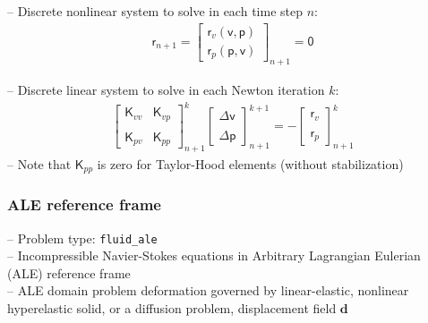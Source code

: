 \documentclass[a4paper,12pt]{report}
\newcommand{\bs}[1]{\boldsymbol{#1}}
\newcommand{\ROP}{\bs{\mathsf{r}}}
\begin{document}
-- Discrete nonlinear system to solve in each time step $n$:
\begin{equation}
\label{equation-nonlin-sys-fluid}
\begin{aligned}
\ROP_{n+1} = \begin{bmatrix} \ROP_{v}(\bs{\mathsf{v}},\bs{\mathsf{p}}) \\ \ROP_{p}(\bs{\mathsf{p}},\bs{\mathsf{v}}) \end{bmatrix}_{n+1} = \bs{\mathsf{0}}
\end{aligned}
\end{equation}

-- Discrete linear system to solve in each Newton iteration $k$:
\begin{equation}
\label{equation-lin-sys-fluid}
\begin{aligned}
\begin{bmatrix} \bs{\mathsf{K}}_{vv} & \bs{\mathsf{K}}_{vp} \\ \\ \bs{\mathsf{K}}_{pv} & \bs{\mathsf{K}}_{pp} \end{bmatrix}_{n+1}^{k}\begin{bmatrix} \Delta\bs{\mathsf{v}} \\ \\ \Delta\bs{\mathsf{p}} \end{bmatrix}_{n+1}^{k+1}=-\begin{bmatrix} \ROP_{v} \\ \\ \ROP_{p} \end{bmatrix}_{n+1}^{k}
\end{aligned}
\end{equation}
-- Note that $\bs{\mathsf{K}}_{pp}$ is zero for Taylor-Hood elements (without stabilization)

\subsubsection{ALE reference frame}\label{ale-reference-frame}

-- Problem type: \verb.fluid_ale.\\

-- Incompressible Navier-Stokes equations in Arbitrary Lagrangian Eulerian (ALE) reference frame\\

-- ALE domain problem deformation governed by linear-elastic, nonlinear hyperelastic solid, or a diffusion problem, displacement field $\bs{d}$\\
\end{document}

